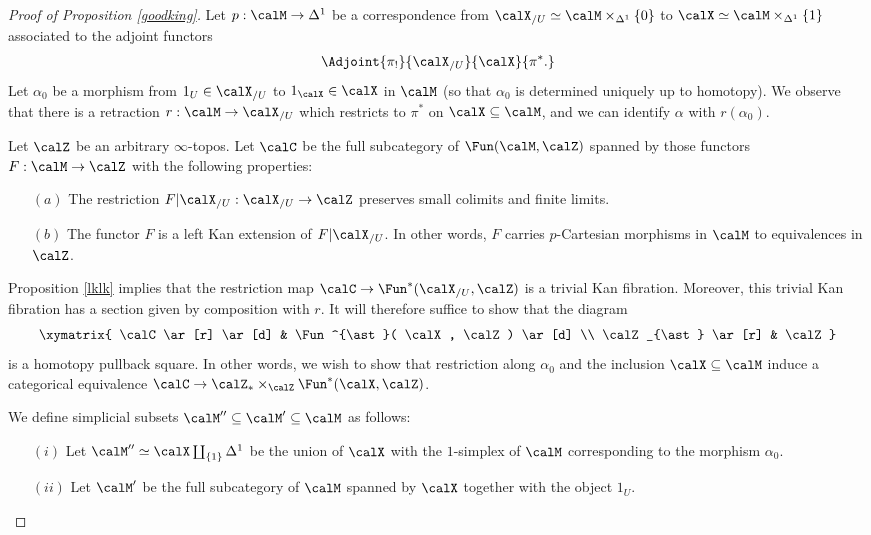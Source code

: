 \begin{proof}[Proof of Proposition \ref{goodking}]
Let $p: \calM \rightarrow \Delta^1$ be a correspondence from $\calX_{/U} \simeq \calM \times_{ \Delta^1} \{0\}$ to $\calX \simeq \calM \times_{ \Delta^1} \{1\}$ associated to the adjoint functors
$$ \Adjoint{ \pi_{!} }{ \calX_{/U} }{\calX}{\pi^{\ast}.}$$
Let $\alpha_0$ be a morphism from $1_{U} \in \calX_{/U}$ to $1_{\calX} \in \calX$
in $\calM$ (so that $\alpha_0$ is determined uniquely up to homotopy). We observe
that there is a retraction $r: \calM \rightarrow \calX_{/U}$ which restricts to $\pi^{\ast}$
on $\calX \subseteq \calM$, and we can identify $\alpha$ with $r( \alpha_0 )$. 

Let $\calZ$ be an arbitrary $\infty$-topos. Let $\calC$ be the full subcategory of
$\Fun( \calM, \calZ)$ spanned by those functors $F: \calM \rightarrow \calZ$ with the following properties:
\begin{itemize}
\item[$(a)$] The restriction $F | \calX_{/U}: \calX_{/U} \rightarrow \calZ$ preserves small colimits and finite limits.
\item[$(b)$] The functor $F$ is a left Kan extension of $F| \calX_{/U}$. In other words, 
$F$ carries $p$-Cartesian morphisms in $\calM$ to equivalences in $\calZ$.
\end{itemize}
Proposition \ref{lklk} implies that the restriction map
$\calC \rightarrow \Fun^{\ast}( \calX_{/U}, \calZ)$ is a trivial Kan fibration. Moreover,
this trivial Kan fibration has a section given by composition with $r$. It will therefore suffice
to show that the diagram
$$ \xymatrix{ \calC \ar[r] \ar[d] & \Fun^{\ast}( \calX, \calZ) \ar[d] \\
\calZ_{\ast} \ar[r] & \calZ }$$
is a homotopy pullback square. In other words, we wish to show that restriction along
$\alpha_0$ and the inclusion $\calX \subseteq \calM$ induce a categorical equivalence
$\calC \rightarrow \calZ_{\ast} \times_{ \calZ} \Fun^{\ast}( \calX, \calZ)$.

We define simplicial subsets $\calM'' \subseteq \calM' \subseteq \calM$ as follows:
\begin{itemize}
\item[$(i)$] Let $\calM'' \simeq \calX \coprod_{ \{1\} } \Delta^1$ be the union of
$\calX$ with the $1$-simplex of $\calM$ corresponding to the morphism $\alpha_0$.
\item[$(ii)$] Let $\calM'$ be the full subcategory of $\calM$ spanned by $\calX$
together with the object $1_U$.
\end{itemize}


\end{proof}
